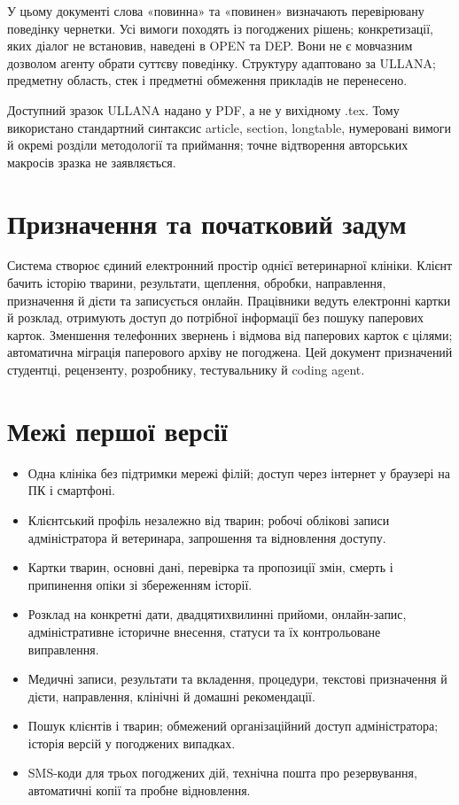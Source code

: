 \documentclass[11pt,a4paper]{article}
\begin{document}
У цьому документі слова «повинна» та «повинен» визначають перевірювану поведінку чернетки. Усі вимоги походять із погоджених рішень; конкретизації, яких діалог не встановив, наведені в OPEN та DEP. Вони не є мовчазним дозволом агенту обрати суттєву поведінку. Структуру адаптовано за ULLANA; предметну область, стек і предметні обмеження прикладів не перенесено.

Доступний зразок ULLANA надано у PDF, а не у вихідному .tex. Тому використано стандартний синтаксис article, section, longtable, нумеровані вимоги й окремі розділи методології та приймання; точне відтворення авторських макросів зразка не заявляється.

\section{Призначення та початковий задум}
Система створює єдиний електронний простір однієї ветеринарної клініки. Клієнт бачить історію тварини, результати, щеплення, обробки, направлення, призначення й дієти та записується онлайн. Працівники ведуть електронні картки й розклад, отримують доступ до потрібної інформації без пошуку паперових карток. Зменшення телефонних звернень і відмова від паперових карток є цілями; автоматична міграція паперового архіву не погоджена. Цей документ призначений студентці, рецензенту, розробнику, тестувальнику й coding agent.

\section{Межі першої версії}
\begin{itemize}
\item Одна клініка без підтримки мережі філій; доступ через інтернет у браузері на ПК і смартфоні.
\item Клієнтський профіль незалежно від тварин; робочі облікові записи адміністратора й ветеринара, запрошення та відновлення доступу.
\item Картки тварин, основні дані, перевірка та пропозиції змін, смерть і припинення опіки зі збереженням історії.
\item Розклад на конкретні дати, двадцятихвилинні прийоми, онлайн-запис, адміністративне історичне внесення, статуси та їх контрольоване виправлення.
\item Медичні записи, результати та вкладення, процедури, текстові призначення й дієти, направлення, клінічні й домашні рекомендації.
\item Пошук клієнтів і тварин; обмежений організаційний доступ адміністратора; історія версій у погоджених випадках.
\item SMS-коди для трьох погоджених дій, технічна пошта про резервування, автоматичні копії та пробне відновлення.
\end{itemize}
\end{document}
